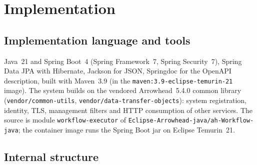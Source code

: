 \documentclass[a4paper]{arrowhead}
\begin{document}
\newpage
\section{Implementation}
\label{sec:implementation}

\subsection{Implementation language and tools}
Java~21 and Spring Boot~4 (Spring Framework~7, Spring Security~7), Spring Data JPA with Hibernate, Jackson for JSON,
Springdoc for the OpenAPI description, built with Maven~3.9 (in the \texttt{maven:3.9-eclipse-temurin-21} image). The
system builds on the vendored Arrowhead~5.4.0 common library (\texttt{vendor/common-utils},
\texttt{vendor/data-transfer-objects}): system registration, identity, TLS, management filters and HTTP consumption
of other services. The source is module \texttt{workflow-executor} of \texttt{Eclipse-Arrowhead-java/ah-Workflow-java}; the
container image runs the Spring Boot jar on Eclipse Temurin~21.

\subsection{Internal structure}
\end{document}
